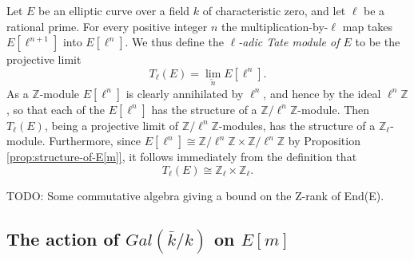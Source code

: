 Let $E$ be an elliptic curve over a field $k$ of characteristic zero, and let $\ell$
be a rational prime.  For every positive integer $n$ the multiplication-by-$\ell$ map
takes $E[\ell^{n+1}]$ into $E[\ell^{n}]$.  We thus define the \emph{$\ell$-adic Tate
  module of $E$} to be the projective limit
\begin{equation*}
  T_{\ell}(E) =  \lim_{\overleftarrow{n}} E[\mathcal{\ell}^{n}].
\end{equation*}
As a $\mathbb{Z}$-module $E[\ell^{n}]$ is clearly annihilated by $\ell^{n}$, and
hence by the ideal $\ell^{n}\mathbb{Z}$, so that each of the $E[\ell^{n}]$ has the
structure of a $\mathbb{Z}/\ell^{n}\mathbb{Z}$-module.  Then $T_{\ell}(E)$, being a
projective limit of $\mathbb{Z}/\ell^{n}\mathbb{Z}$-modules, has the structure of a
$\mathbb{Z}_{\ell}$-module.  Furthermore, since $E[\ell^{n}] \cong
\mathbb{Z}/\ell^{n}\mathbb{Z} \times \mathbb{Z}/\ell^{n}\mathbb{Z}$ by Proposition
\ref{prop:structure-of-E[m]}, it follows immediately from the definition that
\begin{equation*}
  T_{\ell}(E) \cong \mathbb{Z}_{\ell} \times \mathbb{Z}_{\ell}.
\end{equation*}

TODO: Some commutative algebra giving a bound on the Z-rank of End(E).


\subsection{The action of $Gal(\bar{k} / k)$ on $E[m]$}
\label{sec:action-of-Galois-on-m-torsion}

